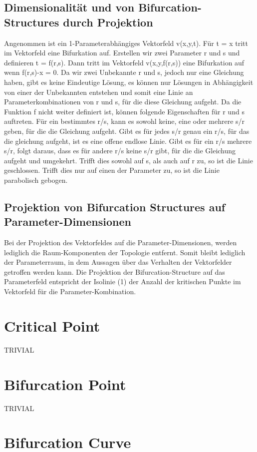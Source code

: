 \documentclass[11pt]{article}
\begin{document}
\subsection{Dimensionalität und von Bifurcation-Structures durch Projektion}
Angenommen ist ein 1-Parameterabhängiges Vektorfeld v(x,y,t). Für t = x tritt im Vektorfeld eine Bifurkation auf.
Erstellen wir zwei Parameter r und s und definieren t = f(r,s). Dann tritt im Vektorfeld v(x,y,f(r,s)) eine Bifurkation auf wenn f(r,s)-x = 0. Da wir zwei Unbekannte r und s, jedoch nur eine Gleichung haben, gibt es keine Eindeutige Lösung, es können nur Lösungen in Abhängigkeit von einer der Unbekannten entstehen und somit eine Linie an Parameterkombinationen von r und s, für die diese Gleichung aufgeht.
Da die Funktion f nicht weiter definiert ist, können folgende Eigenschaften für r und s auftreten.
Für ein bestimmtes r/s, kann es sowohl keine, eine oder mehrere s/r geben, für die die Gleichung aufgeht.
Gibt es für jedes s/r genau ein r/s, für das die gleichung aufgeht, ist es eine offene endlose Linie.
Gibt es für ein r/s mehrere s/r, folgt daraus, dass es für andere r/s keine s/r gibt, für die die Gleichung aufgeht und umgekehrt. Trifft dies sowohl auf s, als auch auf r zu, so ist die Linie geschlossen. Trifft dies nur auf einen der Parameter zu, so ist die Linie parabolisch gebogen.

\subsection{Projektion von Bifurcation Structures auf Parameter-Dimensionen}
Bei der Projektion des Vektorfeldes auf die Parameter-Dimensionen, werden lediglich die Raum-Komponenten der Topologie entfernt. Somit bleibt lediglich der Parameterraum, in dem Aussagen über das Verhalten der Vektorfelder getroffen werden kann.
Die Projektion der Bifurcation-Structure auf das Parameterfeld entspricht der Isolinie (1) der Anzahl der kritischen Punkte im Vektorfeld für die Parameter-Kombination.
\section{Critical Point}
TRIVIAL
\section{Bifurcation Point}
TRIVIAL
\section{Bifurcation Curve}
\end{document}
